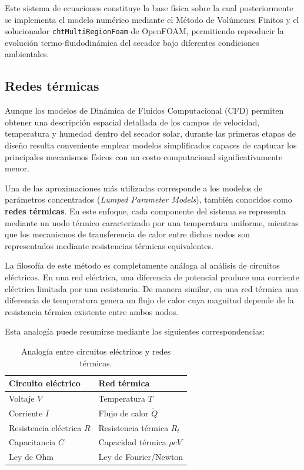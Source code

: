 Este sistema de ecuaciones constituye la base física sobre la cual posteriormente se implementa el modelo numérico mediante el Método de Volúmenes Finitos y el solucionador \texttt{chtMultiRegionFoam} de OpenFOAM, permitiendo reproducir la evolución termo-fluidodinámica del secador bajo diferentes condiciones ambientales.




\subsection{Redes térmicas}

Aunque los modelos de Dinámica de Fluidos Computacional (CFD) permiten obtener una descripción espacial detallada de los campos de velocidad, temperatura y humedad dentro del secador solar, durante las primeras etapas de diseño resulta conveniente emplear modelos simplificados capaces de capturar los principales mecanismos físicos con un costo computacional significativamente menor.

Una de las aproximaciones más utilizadas corresponde a los modelos de parámetros concentrados (\textit{Lumped Parameter Models}), también conocidos como \textbf{redes térmicas}. En este enfoque, cada componente del sistema se representa mediante un nodo térmico caracterizado por una temperatura uniforme, mientras que los mecanismos de transferencia de calor entre dichos nodos son representados mediante resistencias térmicas equivalentes.

La filosofía de este método es completamente análoga al análisis de circuitos eléctricos. En una red eléctrica, una diferencia de potencial produce una corriente eléctrica limitada por una resistencia. De manera similar, en una red térmica una diferencia de temperatura genera un flujo de calor cuya magnitud depende de la resistencia térmica existente entre ambos nodos.

Esta analogía puede resumirse mediante las siguientes correspondencias:

\begin{table}[H]
\centering
\caption{Analogía entre circuitos eléctricos y redes térmicas.}
\begin{tabular}{ll}
\toprule
Circuito eléctrico & Red térmica\\
\midrule
Voltaje $V$ & Temperatura $T$\\
Corriente $I$ & Flujo de calor $\dot Q$\\
Resistencia eléctrica $R$ & Resistencia térmica $R_t$\\
Capacitancia $C$ & Capacidad térmica $\rho cV$\\
Ley de Ohm & Ley de Fourier/Newton\\
\bottomrule
\end{tabular}
\end{table}

